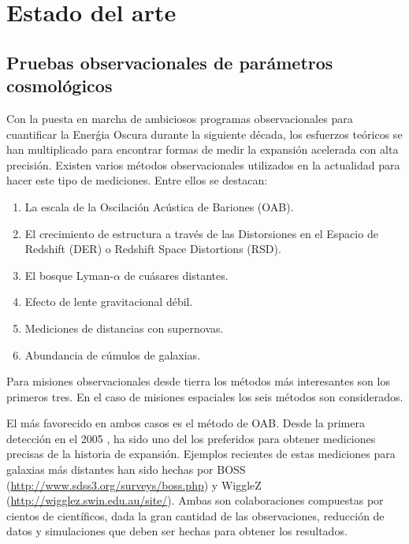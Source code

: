 
\section{Estado del arte}

\subsection{Pruebas observacionales de par\'ametros cosmol\'ogicos}
Con la puesta en marcha de ambiciosos programas observacionales para
cuantificar la Ener\'gia Oscura durante la siguiente d\'ecada, los
esfuerzos te\'oricos se han  multiplicado para encontrar formas de
medir la expansi\'on acelerada con alta precisi\'on. 
Existen varios
m\'etodos observacionales utilizados en la actualidad para hacer este
tipo de mediciones. 
Entre ellos se destacan:

\begin{enumerate}
\item La escala de la Oscilaci\'on Ac\'ustica de Bariones (OAB).
\item El crecimiento de estructura a trav\'es de las Distorsiones en
  el Espacio de Redshift (DER) o Redshift Space Distortions (RSD).
\item El bosque Lyman-$\alpha$ de cuásares distantes.
\item Efecto de lente gravitacional d\'ebil.
\item Mediciones de distancias con supernovas.
\item Abundancia de c\'umulos de galaxias.
\end{enumerate}

Para misiones observacionales desde tierra los m\'etodos m\'as interesantes 
son los primeros tres. 
En el caso de misiones espaciales los seis m\'etodos son considerados.

El más favorecido en ambos casos es el m\'etodo de OAB. 
Desde la primera detecci\'on en el 2005 \cite{Eisenstein2005},
ha sido uno del los preferidos para obtener mediciones precisas de la
historia de expansi\'on. Ejemplos recientes de estas mediciones
\cite{wigglez,BOSS} para
galaxias m\'as distantes han sido hechas por BOSS
(\url{http://www.sdss3.org/surveys/boss.php}) y WiggleZ
(\url{http://wigglez.swin.edu.au/site/}). 
Ambas son colaboraciones compuestas por cientos de cient\'ificos, dada
la gran cantidad de las observaciones, reducci\'on de datos y
simulaciones que deben ser hechas para obtener los resultados. 

